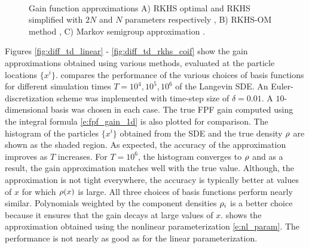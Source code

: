 \begin{figure}[htbp]
	\centering
\mbox{
		     \qquad
		     \qquad
		}
	\caption[$\gradTD$-RKHS-OM performance with $N$ and $d$]{Gain function approximations A) RKHS optimal and RKHS simplified with $2N$ and $N$ parameters respectively \cite{radmey18a}, B) RKHS-OM method \cite{radmey19}, C) Markov semigroup approximation \cite{tagmeh16}.}
	\label{fig:diff_td_rkhs_coif_d2510}
\end{figure}

Figures \ref{fig:diff_td_linear} - \ref{fig:diff_td_rkhs_coif} show the gain approximations obtained using various methods, evaluated at the particle locations $\{x^i\}$.  compares the performance of the various choices of basis functions for different simulation times $T = 10^4, 10^5, 10^6$ of the Langevin SDE. An Euler-discretization scheme was implemented with time-step size of $\delta = 0.01$. A $10$-dimensional basis was chosen in each case. The true FPF gain computed using the integral formula \eqref{e:fpf_gain_1d} is also plotted for comparison. The histogram of the particles $\{x^i\}$ obtained from the SDE and the true density $\rho$ are shown as the shaded region. As expected, the accuracy of the approximation improves as $T$ increases. For $T=10^6$, the histogram converges to $\rho$ and as a result, the gain approximation matches well with the true value. Although, the approximation is not tight everywhere, the accuracy is typically better at values of $x$ for which $\rho(x)$ is large. All three choices of basis functions perform nearly similar. Polynomials weighted by the component densities $\rho_i$ is a better choice because it ensures that the gain decays at large values of $x$.  shows the approximation obtained using the nonlinear parameterization \eqref{e:nl_param}. The performance is not nearly as good as for the linear parameterization.

